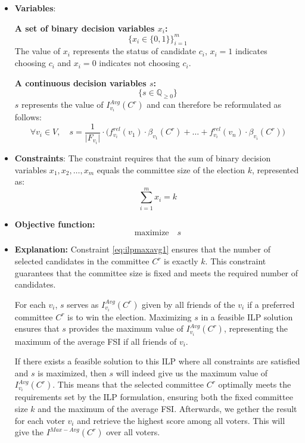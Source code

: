 \documentclass{article}
\begin{document}
\begin{itemize}
  \item \textbf{Variables}: 

\textbf{A set of binary decision variables $x_i$:} \[ \bigg\{ x_i \in \{0, 1\} \bigg\}_{i=1}^m \] The value of $x_i$ represents the status of candidate $c_i$, \(x_i = 1\) indicates choosing $c_i$ and \(x_i = 0\) indicates not choosing $c_i$.


\textbf{A continuous decision variables $s$:} 
\[ \bigg\{ s\in \mathbb{Q}_{\geq 0} \bigg\}\] 
$s$ represents the value of $I_{v_i}^{Avg}(C^{r})$ and can therefore be reformulated as follows:
\[ \forall v_i \in V, \quad
 s = \frac{1}{\vert F_{v_i} \vert}\cdot \Big(f_{v_i}^{rel}(v_1) \cdot \beta_{v_1}(C^{r})+\dots+f_{v_i}^{rel}(v_n) \cdot \beta_{v_i}(C^{r})\Big)\]
    \item \textbf{Constraints}:
The constraint requires that the sum of binary decision variables \(x_1, x_2, \ldots, x_m\) equals the committee size of the election \(k\), represented as:
\begin{equation} \sum_{i=1}^m x_i = k     \label{eq:ilpmaxavg1}
\end{equation}
  
  \item  \textbf{Objective function:}
  \[\text{maximize} \quad s\]

  \item  \textbf{Explanation:}
Constraint \ref{eq:ilpmaxavg1} ensures that the number of selected candidates in the committee \(C^r\) is exactly \(k\). This constraint guarantees that the committee size is fixed and meets the required number of candidates.

For each $v_i$, \(s\) serves as $I_{v_i}^{Avg}(C^{r})$ given by all friends of the $v_i$ if a preferred committee \(C^r\) is to win the election. Maximizing \(s\) in a feasible ILP solution ensures that \(s\) provides the maximum value of \(I_{v_i}^{Avg}(C^{r})\), representing the maximum of the average FSI if all friends of $v_i$. 

If there exists a feasible solution to this ILP where all constraints are satisfied and \(s\) is maximized, then \(s\) will indeed give us the maximum value of  \(I_{v_i}^{Avg}(C^{r})\). This means that the selected committee \(C^r\) optimally meets the requirements set by the ILP formulation, ensuring both the fixed committee size \(k\) and the maximum of the average FSI. Afterwards, we gether the result for each voter $v_i$ and retrieve the highest score among all voters. This will give the $I^{Max-Avg}(C^{r})$ over all voters.

\end{itemize}
\end{document}
